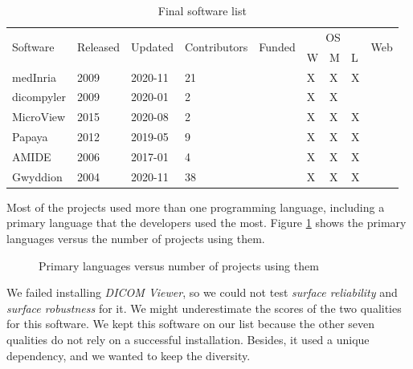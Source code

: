 \begin{table}[H]
\begin{tabular}{lllllllll}
\hline
\multirow{2}{*}{Software} & \multirow{2}{*}{Released} & \multirow{2}{*}{Updated} & \multirow{2}{*}{Contributors} & \multirow{2}{*}{Funded} & \multicolumn{3}{c}{OS} & \multirow{2}{*}{Web} \\ \cline{6-8}
 &  &  &  &  & W & M & L &  \\ \hline
medInria \cite{Fillard2012} & 2009 & 2020-11 & 21 &  & X & X & X &  \\
dicompyler \cite{Panchal2010} & 2009 & 2020-01 & 2 &  & X & X &  &  \\
MicroView \cite{ParallaxInnovations2020} & 2015 & 2020-08 & 2 &  & X & X & X &  \\
Papaya \cite{UTHSCSA2019} & 2012 & 2019-05 & 9 &  & X & X & X &  \\
AMIDE \cite{Loening2017} & 2006 & 2017-01 & 4 &  & X & X & X &  \\
Gwyddion \cite{Nevcas2012} & 2004 & 2020-11 & 38 &  & X & X & X &  \\ \hline
\end{tabular}
\caption{\label{tab_final_list}Final software list}
\end{table}

Most of the projects used more than one programming language, including a primary language that the developers used the most. Figure \ref{fig_language} shows the primary languages versus the number of projects using them.

\begin{figure}[H]
\centering
{}
\caption{\label{fig_language}Primary languages versus number of projects using them}
\end{figure}

We failed installing \textit{DICOM Viewer}, so we could not test \textit{surface reliability} and \textit{surface robustness} for it. We might underestimate the scores of the two qualities for this software. We kept this software on our list because the other seven qualities do not rely on a successful installation. Besides, it used a unique dependency, and we wanted to keep the diversity.

